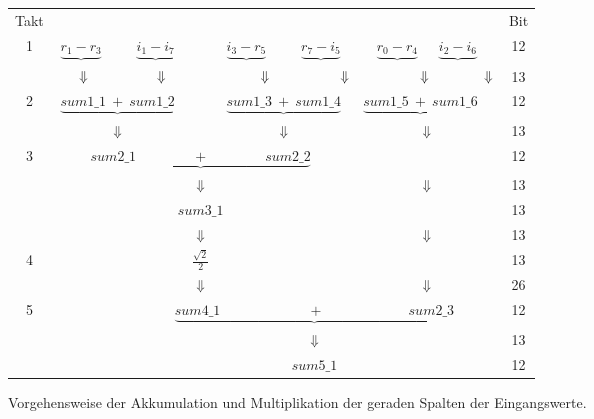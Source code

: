 \begin{figure}[htbp]
\begin{tabular}{ccccccccccccc}
Takt&\multicolumn{11}{c}{}&Bit\\
1 &$\underbrace{r_1 - r_3}$ &        &$ \underbrace{i_1 - i_7}$ &  &$\underbrace{i_3 - r_5}$ &  &$\underbrace{r_7 - i_5}$ &  &$\underbrace{r_0 - r_4}$ &$\underbrace{i_2 - i_6}$& &12\\
  &\multicolumn{11}{l}{$\hspace{0.5cm} \Downarrow \hspace{1.75cm} \Downarrow \hspace{2.4cm} \Downarrow \hspace{1.8cm}\Downarrow \hspace{1.8cm}\Downarrow \hspace{1.4cm}\Downarrow$}&13\\
2 &\multicolumn{3}{c}{$\underbrace{sum1\_1 \: + \: sum1\_2}$} & & \multicolumn{3}{c}{$\underbrace{sum1\_3 \: + \: sum1\_4}$} &\multicolumn{3}{c}{$\: \underbrace{sum1\_5 \: + \: sum1\_6}$}& &12\\
  &\multicolumn{3}{c}{$\Downarrow$}  & & \multicolumn{3}{c}{$\Downarrow$} & & \multicolumn{2}{c}{$\Downarrow$}& &13\\
3 &\multicolumn{7}{c}{$\underbrace{sum2\_1 \quad  \quad \quad \quad + \quad \quad \quad  \quad sum2\_2}$} & & & & &12\\
  &\multicolumn{7}{c}{$\Downarrow$}& & \multicolumn{2}{c}{$\Downarrow$}& &13\\
  &\multicolumn{7}{c}{$sum3\_1$}& & & & &13\\
  & & & & $\Downarrow$& & & & & \multicolumn{2}{c}{$\Downarrow$} & & 13\\
4 & & & & $\frac{\sqrt{2}}{2}$&\multicolumn{5}{c}{}& & &13\\
  & & & & $\Downarrow$& & & & & \multicolumn{2}{c}{$\Downarrow$ }& & 26\\
5 & & & \multicolumn{9}{c}{$\underbrace{sum4\_1 \:  \quad \quad \quad \quad \quad \quad + \quad \quad \quad \quad \quad \quad   sum2\_3}$} &12\\
  & & & \multicolumn{9}{c}{$\Downarrow$}&13\\
  & & & \multicolumn{9}{c}{$sum5\_1$}&12\\
\end{tabular}
\caption{Vorgehensweise der Akkumulation und Multiplikation der geraden Spalten der Eingangswerte.}
\label{pic:AkkumulationGeradeSpalten}
\end{figure}



